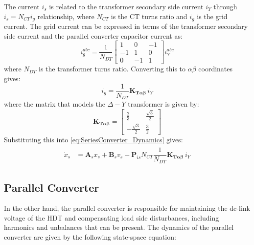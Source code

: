 The current $i_s$ is related to the transformer secondary side current $i_Y$ through $i_s = N_{CT} i_g$ relationship, where $N_{CT}$ is the CT turns ratio and $i_g$ is the grid current. The grid current can be expressed in terms of the transformer secondary side current and the parallel converter capacitor current as:
\begin{equation}
    i_g^{abc} = \dfrac{1}{N_{DT}}
    \begin{bmatrix}
        1 & 0 & -1 \\
        -1 & 1 & 0 \\
        0 & -1 & 1
    \end{bmatrix}
    i_Y^{abc}
\end{equation}
where $N_{DT}$ is the transformer turns ratio. Converting this to $\alpha\beta$ coordinates gives:
\begin{equation}
    i_g = \dfrac{1}{N_{DT}} \mathbf{K_{T\alpha\beta}}\, i_Y
\end{equation}
where the matrix that models the $\Delta-Y$ transformer is given by:
\begin{equation}
    \mathbf{K_{T\alpha\beta}} = 
    \begin{bmatrix} 
        \frac{2}{3} & \frac{\sqrt{3}}{2}\\
        -\frac{\sqrt{3}}{2} & \frac{3}{2} 
    \end{bmatrix}
\end{equation}
Substituting this into \eqref{eq:SeriesConverter_Dynamics} gives:
\begin{align}
    \begin{aligned}
        \dot{x}_s &= \mathbf{A}_s x_s + \mathbf{B}_s v_s + \mathbf{P}_{is} N_{CT} \dfrac{1}{N_{DT}} \mathbf{K_{T\alpha\beta}}\, i_Y
    \end{aligned}
\end{align}

\subsection{Parallel Converter}

In the other hand, the parallel converter is responsible for maintaining the dc-link voltage of the HDT and compensating load side disturbances, including harmonics and unbalances that can be present. The dynamics of the parallel converter are given by the following state-space equation:

